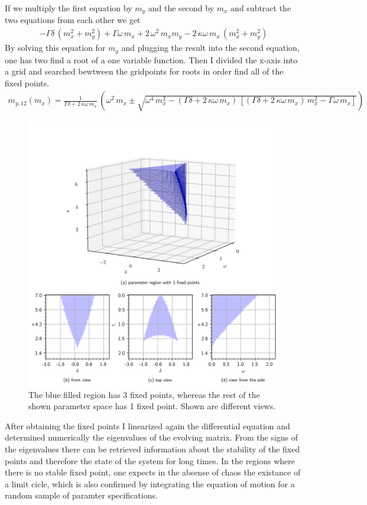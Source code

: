 \documentclass{article}
\begin{document}
If we multiply the first equation by $m_y$ and the second by $m_x$ and subtract the two equations from each other we get
\begin{align*}
    -\Gamma\delta\,(m_x^2+m_y^2)+\Gamma\omega\,m_x+2\,\omega^2\,m_xm_y-2\,\kappa\omega\,m_x\,(m_x^2+m_y^2)
\end{align*}
By solving this equation for $m_y$ and plugging the result into the second equation, one has two find a root of a one variable function. Then I divided the x-axis into a grid and searched bewtween the gridpoints for roots in order find all of the fixed points.
\begin{align*}
    m_{y,12}(m_x)=\frac{1}{\Gamma\delta+2\,\kappa\omega\,m_x}\,\left( \omega^2\,m_x\pm \sqrt{\omega^4\,m_x^2-(\Gamma\delta+2\,\kappa\omega\,m_x)\,[(\Gamma\delta+2\,\kappa\omega\,m_x)\,m_x^2-\Gamma\omega\,m_x]} \right)
\end{align*}
\begin{figure}[H]
    \hspace*{-1.2cm}
    \includegraphics{pictures/numb_of_fixp.png}
    \caption{The blue filled region has 3 fixed points, whereas the rest of the shown parameter space has 1 fixed point. Shown are different views.}
\end{figure}\newpage
After obtaining the fixed points I linearized again the differential equation and determined numerically the eigenvalues of the evolving matrix. From the signs of the eigenvalues there can be retrieved information about the stability of the fixed points and therefore the state of the system for long times. In the regions where there is no stable fixed point, one expects in the absense of chaos the existance of a limit cicle, which is also confirmed by integrating the equation of motion for a random sample of paramter specifications.
\end{document}
